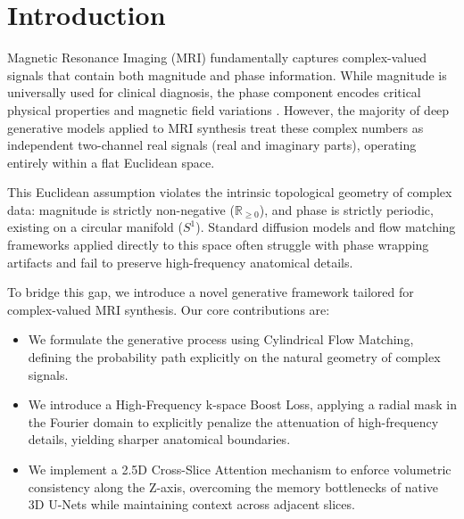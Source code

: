 \section{Introduction}
\label{sec:intro}

Magnetic Resonance Imaging (MRI) fundamentally captures complex-valued signals that contain both magnitude and phase information. While magnitude is universally used for clinical diagnosis, the phase component encodes critical physical properties and magnetic field variations \cite{desai2021skmtea}. However, the majority of deep generative models applied to MRI synthesis treat these complex numbers as independent two-channel real signals (real and imaginary parts), operating entirely within a flat Euclidean space.

This Euclidean assumption violates the intrinsic topological geometry of complex data: magnitude is strictly non-negative ($\mathbb{R}_{\ge 0}$), and phase is strictly periodic, existing on a circular manifold ($S^1$). Standard diffusion models and flow matching frameworks \cite{lipman2022flow} applied directly to this space often struggle with phase wrapping artifacts and fail to preserve high-frequency anatomical details.

To bridge this gap, we introduce a novel generative framework tailored for complex-valued MRI synthesis. Our core contributions are:
\begin{itemize}
    \item We formulate the generative process using Cylindrical Flow Matching, defining the probability path explicitly on the natural geometry of complex signals.
    \item We introduce a High-Frequency k-space Boost Loss, applying a radial mask in the Fourier domain to explicitly penalize the attenuation of high-frequency details, yielding sharper anatomical boundaries.
    \item We implement a 2.5D Cross-Slice Attention mechanism to enforce volumetric consistency along the Z-axis, overcoming the memory bottlenecks of native 3D U-Nets while maintaining context across adjacent slices.
\end{itemize}